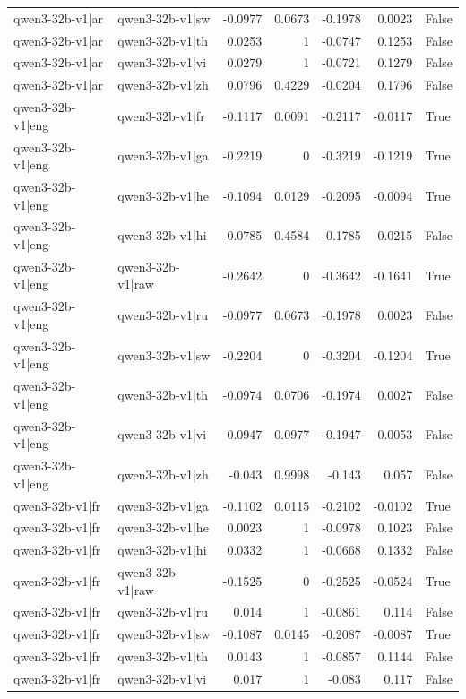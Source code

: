 \begin{table}
\begin{tabular}{l l r r r r l}
qwen3-32b-v1|ar & qwen3-32b-v1|sw & -0.0977 & 0.0673 & -0.1978 & 0.0023 & False \\
qwen3-32b-v1|ar & qwen3-32b-v1|th & 0.0253 & 1 & -0.0747 & 0.1253 & False \\
qwen3-32b-v1|ar & qwen3-32b-v1|vi & 0.0279 & 1 & -0.0721 & 0.1279 & False \\
qwen3-32b-v1|ar & qwen3-32b-v1|zh & 0.0796 & 0.4229 & -0.0204 & 0.1796 & False \\
qwen3-32b-v1|eng & qwen3-32b-v1|fr & -0.1117 & 0.0091 & -0.2117 & -0.0117 & True \\
qwen3-32b-v1|eng & qwen3-32b-v1|ga & -0.2219 & 0 & -0.3219 & -0.1219 & True \\
qwen3-32b-v1|eng & qwen3-32b-v1|he & -0.1094 & 0.0129 & -0.2095 & -0.0094 & True \\
qwen3-32b-v1|eng & qwen3-32b-v1|hi & -0.0785 & 0.4584 & -0.1785 & 0.0215 & False \\
qwen3-32b-v1|eng & qwen3-32b-v1|raw & -0.2642 & 0 & -0.3642 & -0.1641 & True \\
qwen3-32b-v1|eng & qwen3-32b-v1|ru & -0.0977 & 0.0673 & -0.1978 & 0.0023 & False \\
qwen3-32b-v1|eng & qwen3-32b-v1|sw & -0.2204 & 0 & -0.3204 & -0.1204 & True \\
qwen3-32b-v1|eng & qwen3-32b-v1|th & -0.0974 & 0.0706 & -0.1974 & 0.0027 & False \\
qwen3-32b-v1|eng & qwen3-32b-v1|vi & -0.0947 & 0.0977 & -0.1947 & 0.0053 & False \\
qwen3-32b-v1|eng & qwen3-32b-v1|zh & -0.043 & 0.9998 & -0.143 & 0.057 & False \\
qwen3-32b-v1|fr & qwen3-32b-v1|ga & -0.1102 & 0.0115 & -0.2102 & -0.0102 & True \\
qwen3-32b-v1|fr & qwen3-32b-v1|he & 0.0023 & 1 & -0.0978 & 0.1023 & False \\
qwen3-32b-v1|fr & qwen3-32b-v1|hi & 0.0332 & 1 & -0.0668 & 0.1332 & False \\
qwen3-32b-v1|fr & qwen3-32b-v1|raw & -0.1525 & 0 & -0.2525 & -0.0524 & True \\
qwen3-32b-v1|fr & qwen3-32b-v1|ru & 0.014 & 1 & -0.0861 & 0.114 & False \\
qwen3-32b-v1|fr & qwen3-32b-v1|sw & -0.1087 & 0.0145 & -0.2087 & -0.0087 & True \\
qwen3-32b-v1|fr & qwen3-32b-v1|th & 0.0143 & 1 & -0.0857 & 0.1144 & False \\
qwen3-32b-v1|fr & qwen3-32b-v1|vi & 0.017 & 1 & -0.083 & 0.117 & False \\

\end{tabular}
\end{table}
